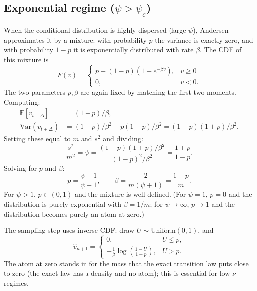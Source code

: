\documentclass[11pt]{article}
\theoremstyle{plain}
\theoremstyle{definition}
\theoremstyle{remark}
\begin{document}
\subsection{Exponential regime ($\psi > \psi_c$)}

When the conditional distribution is highly dispersed (large $\psi$), Andersen approximates it by a mixture: with probability $p$ the variance is exactly zero, and with probability $1 - p$ it is exponentially distributed with rate $\beta$. The CDF of this mixture is
\begin{equation}
    F(v) = \begin{cases} p + (1-p)(1 - e^{-\beta v}), & v \geq 0 \\ 0, & v < 0. \end{cases}                     \label{eq:exp-cdf}
\end{equation}
The two parameters $p, \beta$ are again fixed by matching the first two moments. Computing:
\begin{align*}
    \mathbb{E}[v_{t+\Delta}] &= (1-p)/\beta, \\
    \mathrm{Var}(v_{t+\Delta}) &= (1-p)/\beta^2 + p(1-p)/\beta^2 = (1-p)(1+p)/\beta^2.
\end{align*}
Setting these equal to $m$ and $s^2$ and dividing:
\[
    \frac{s^2}{m^2} = \psi = \frac{(1-p)(1+p)/\beta^2}{(1-p)^2/\beta^2} = \frac{1+p}{1-p}.
\]
Solving for $p$ and $\beta$:
\begin{equation}
    p = \frac{\psi - 1}{\psi + 1}, \qquad \beta = \frac{2}{m(\psi + 1)} = \frac{1 - p}{m}.                       \label{eq:p-beta}
\end{equation}
For $\psi > 1$, $p \in (0, 1)$ and the mixture is well-defined. (For $\psi = 1$, $p = 0$ and the distribution is purely exponential with $\beta = 1/m$; for $\psi \to \infty$, $p \to 1$ and the distribution becomes purely an atom at zero.)

The sampling step uses inverse-CDF: draw $U \sim \mathrm{Uniform}(0, 1)$, and
\begin{equation}
    \hat v_{n+1} = \begin{cases} 0, & U \leq p, \\ -\frac{1}{\beta} \log\!\left(\frac{1 - U}{1 - p}\right), & U > p. \end{cases}                                                                                                  \label{eq:exp-sample}
\end{equation}
The atom at zero stands in for the mass that the exact transition law puts close to zero (the exact law has a density and no atom); this is essential for low-$\nu$ regimes.
\end{document}
